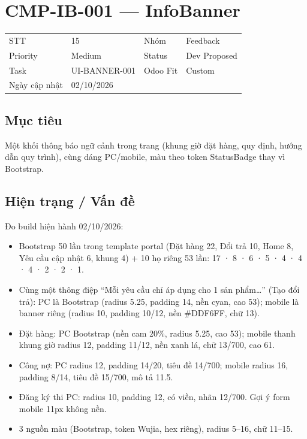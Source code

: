 \documentclass[11pt,a4paper]{report}
\begin{document}
\section{CMP-IB-001 --- InfoBanner}
\begin{tabularx}{\textwidth}{@{}l X l X@{}}\toprule
STT & 15 & Nhóm & Feedback\\
Priority & Medium & Status & Dev Proposed\\
Task & UI-BANNER-001 & Odoo Fit & Custom\\
Ngày cập nhật & 02/10/2026 & & \\\bottomrule\end{tabularx}
\subsection*{Mục tiêu}
Một khối thông báo ngữ cảnh trong trang (khung giờ đặt hàng, quy định, hướng dẫn quy trình), cùng dáng PC/\allowbreak{}mobile, màu theo token StatusBadge thay vì Bootstrap.\par
\subsection*{Hiện trạng / Vấn đề}
Đo build hiện hành 02/\allowbreak{}10/\allowbreak{}2026:\par
\begin{itemize}
\item Bootstrap  50 lần trong template portal (Đặt hàng 22, Đổi trả 10, Home 8, Yêu cầu cập nhật 6, khung 4) + 10 họ riêng 53 lần:  17 ·  8 ·  6 ·  5 ·  4 ·  4 ·  4 ·  2 ·  2 ·  1.
\item Cùng một thông điệp “Mỗi yêu cầu chỉ áp dụng cho 1 sản phẩm…” (Tạo đổi trả): PC là  Bootstrap (radius 5.25, padding 14, nền cyan, cao 53); mobile là banner riêng (radius 10, padding 10/\allowbreak{}12, nền \#DDF6FF, chữ 13).
\item Đặt hàng: PC  Bootstrap (nền cam 20\%, radius 5.25, cao 53); mobile thanh khung giờ radius 12, padding 11/\allowbreak{}12, nền xanh lá, chữ 13/\allowbreak{}700, cao 61.
\item Công nợ: PC radius 12, padding 14/\allowbreak{}20, tiêu đề 14/\allowbreak{}700; mobile radius 16, padding 8/\allowbreak{}14, tiêu đề 15/\allowbreak{}700, mô tả 11.5.
\item Đăng ký thi PC: radius 10, padding 12, có viền, nhãn 12/\allowbreak{}700. Gợi ý form mobile 11px không nền.
\item 3 nguồn màu (Bootstrap, token Wujia, hex riêng), radius 5–16, chữ 11–15.
\end{itemize}
\end{document}
